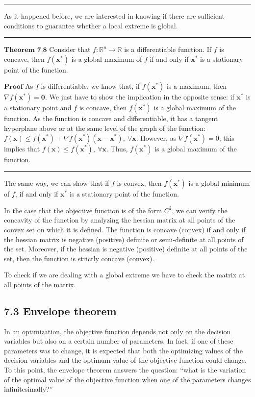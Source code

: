 \documentclass[0pt, a4paper]{article}
\begin{document}
\noindent\rule{\textwidth}{1pt}

As it happened before, we are interested in knowing if there are sufficient conditions to guarantee whether a local extreme is global.

\noindent\rule{\textwidth}{1pt}

$\textbf{Theorem 7.8}$ Consider that $f:\mathbb{R}^n\to\mathbb{R}$ is a differentiable function. If $f$ is concave, then $f(\textbf{x}^*)$ is a global maximum of $f$ if and only if $\textbf{x}^*$ is a stationary point of the function.

$\textbf{Proof}$ As $f$ is differentiable, we know that, if $f(\textbf{x}^*)$ is a maximum, then $\nabla f(\textbf{x}^*)=\textbf{0}$. We just have to show the implication in the opposite sense: if $\textbf{x}^*$ is a stationary point and $f$ is concave, then $f(\textbf{x}^*)$ is a global maximum of the function. As the function is concave and differentiable, it has a tangent hyperplane above or at the same level of the graph of the function: $f(\textbf{x})\leq f(\textbf{x}^*)+\nabla f(\textbf{x}^*)(\textbf{x}-\textbf{x}^*),\ \forall\textbf{x}$. However, as $\nabla f(\textbf{x}^*)=0$, this implies that $f(\textbf{x})\leq f(\textbf{x}^*),\ \forall\textbf{x}$. Thus, $f(\textbf{x}^*)$ is a global maximum of the function.

\noindent\rule{\textwidth}{1pt}

The same way, we can show that if $f$ is convex, then $f(\textbf{x}^*)$ is a global minimum of $f$, if and only if $\textbf{x}^*$ is a stationary point of the function. 

In the case that the objective function is of the form $C^2$, we can verify the concavity of the function  by analyzing the hessian matrix at all points of the convex set on which it is defined. The function is concave (convex) if and only if the hessian matrix is negative (positive) definite or semi-definite at all points of the set. Moreover, if the hessian is negative (positive) definite at all points of the set, then the function is strictly concave (convex).

To check if we are dealing with a global extreme we have to check the matrix at all points of the matrix.


\subsection*{7.3 Envelope theorem}

In an optimization, the objective function depends not only on the decision variables but also on a certain number of parameters. In fact, if one of these parameters was to change, it is expected that both the optimizing values of the decision variables and the optimum value of the objective function could change. To this point, the envelope theorem answers the question: ``what is the variation of the optimal value of the objective function when one of the parameters changes infinitesimally?''
\end{document}
